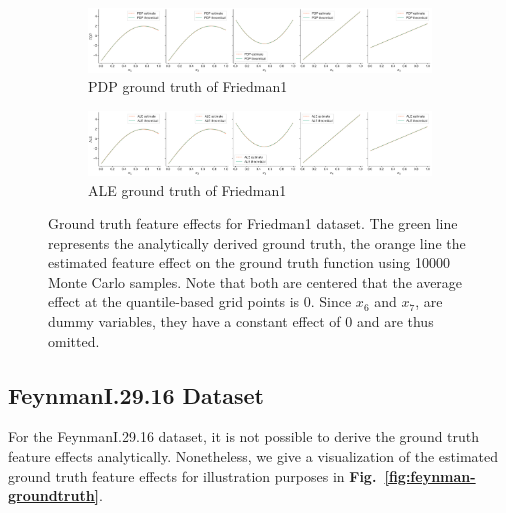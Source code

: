 \documentclass[runningheads]{llncs}
\begin{document}
\begin{figure}[h!]
    \begin{subfigure}[b]{\textwidth}
        \centering
        \includegraphics[width=\textwidth]{img/Friedman1-all/pdp_groundtruth_comparison.png}
        \caption{PDP ground truth of Friedman1}
    \end{subfigure}
    \begin{subfigure}[b]{\textwidth}
        \centering
        \includegraphics[width=\textwidth]{img/Friedman1-all/ale_groundtruth_comparison.png}
        \caption{ALE ground truth of Friedman1}
    \end{subfigure}
    \caption{Ground truth feature effects for Friedman1 dataset. The green line
    represents the analytically derived ground truth, the orange line the estimated feature
    effect on the ground truth function using 10000 Monte Carlo samples. Note that both
    are centered that the average effect at the quantile-based grid points is 0.
    Since $x_6$ and $x_7$, are dummy variables, they have a constant effect of 0 and are
    thus omitted.}
    \label{fig:friedman1-groundtruth}  %
\end{figure}


\subsection{FeynmanI.29.16 Dataset}

For the FeynmanI.29.16 dataset, it is not possible to derive the ground truth
feature effects analytically. Nonetheless, we give a visualization of the
estimated ground truth feature effects for illustration purposes in
\textbf{Fig.~\ref{fig:feynman-groundtruth}}.
\end{document}

